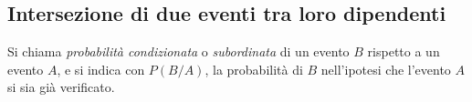 \vspazio\ovalbox{\risolvii \ref{ese:9.46}, \ref{ese:9.47}, \ref{ese:9.48}, \ref{ese:9.49}, \ref{ese:9.50}, \ref{ese:9.51}, \ref{ese:9.52}, \ref{ese:9.53}, \ref{ese:9.54}, \ref{ese:9.55}, \ref{ese:9.56}, \ref{ese:9.57}, \ref{ese:9.58}}


\subsection{Intersezione di due eventi tra loro dipendenti}

\begin{definizione}
Si chiama \emph{probabilità condizionata} o \emph{subordinata} di un evento $B$ rispetto a un evento $A$, e si indica con $P(B/A)$, la probabilità di $B$ nell'ipotesi che l'evento $A$ si sia già verificato.
\end{definizione}

